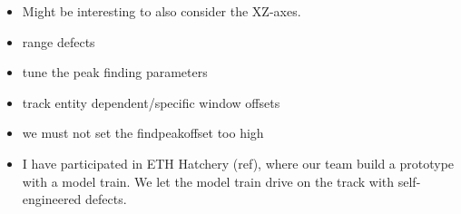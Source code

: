 \begin{itemize}
	\item Might be interesting to also consider the XZ-axes.
	\item range defects
	\item tune the peak finding parameters
	\item track entity dependent/specific window offsets
	\item we must not set the findpeakoffset too high
	
	\item I have participated in ETH Hatchery (ref), where our team build a prototype with a model train. We let the model train drive on the track with self-engineered defects. 
\end{itemize}




\newpage
